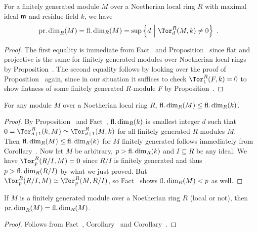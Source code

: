 \documentclass[a4paper,parskip=half,numbers=enddot, DIV=12]{scrreprt}
\begin{document}
\begin{cor}
	For a finitely generated module $M$ over a Noetherian local ring $R$ with maximal ideal $\mathfrak{m}$ and residue field $k$, we have
	\begin{align*}
		\pdim_R(M)=\fdim_R(M)=\sup\left\{d\st \Tor_d^R(M,k)\neq 0\right\}\;.
	\end{align*}
\end{cor}
\begin{proof}
	The first equality is immediate from Fact~ and Proposition~ since flat and projective is the same for finitely generated modules over Noetherian local rings by Proposition~. The second equality follows by looking over the proof of Proposition~ again, since in our situation it suffices to check $\Tor_1^R(F,k)=0$ to show flatness of some finitely generated $R$-module $F$ by Proposition~.
\end{proof}
\begin{cor}
	For any module $M$ over a Noetherian local ring $R$, $\operatorname{fl.dim}_R(M)\leq \operatorname{fl.dim}_R(k)$.
\end{cor}
\begin{proof}
	By Proposition~ and Fact~, $\operatorname{fl.dim}_R(k)$ is smallest integer $d$ such that $0=\Tor_{d+1}^R(k,M)\simeq \Tor_{d+1}^R(M,k)$ for all finitely generated $R$-modules $M$. Then $\operatorname{fl.dim}_R(M)\leq \operatorname{fl.dim}_R(k)$ for $M$ finitely generated follows immediately from Corollary~. Now let $M$ be arbitrary, $p>\operatorname{fl.dim}_R(k)$ and $I\subseteq R$ be any ideal. We have $\Tor_p^R(R/I,M)=0$ since $R/I$ is finitely generated and thus $p>\operatorname{fl.dim}_R(R/I)$ by what we just proved. But $\Tor_p^R(R/I,M)\simeq\Tor_p^R(M,R/I)$, so Fact~ shows $\operatorname{fl.dim}_R(M)<p$ as well.
\end{proof}
\begin{cor}
	If $M$ is a finitely generated module over a Noetherian ring $R$ (local or not), then $\operatorname{pr.dim}_R(M)=\operatorname{fl.dim}_R(M)$.
\end{cor}
\begin{proof}
	Follows from Fact~, Corollary~ and Corollary~.
\end{proof}
\end{document}
